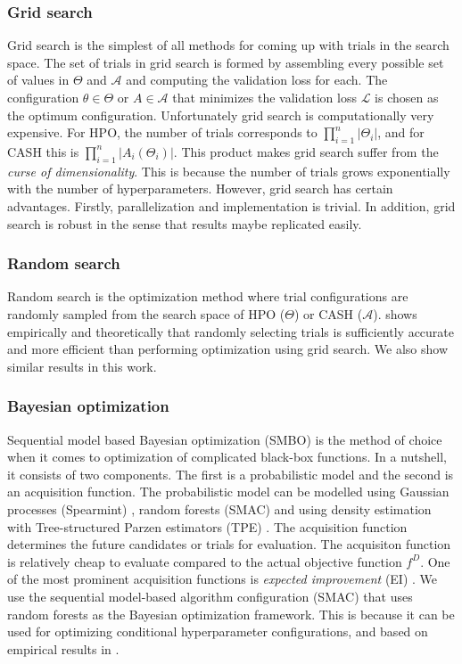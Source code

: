 \subsubsection{Grid search}
\label{grid}
Grid search is the simplest of all methods for coming up with trials in the search space. The set of trials in grid search is formed by assembling every possible set of values in $\Theta$ and $\mathcal{A}$ and computing the validation loss for each. The configuration $\theta \in \Theta$ or $A \in \mathcal{A}$ that minimizes the validation loss $\mathcal{L}$ is chosen as the optimum configuration. Unfortunately grid search is computationally very expensive. For HPO, the number of trials corresponds to $\prod_{i=1}^n |\Theta_i|$, and for CASH this is $\prod_{i=1}^n |A_i(\Theta_i)|$. This product makes grid search suffer from the \textit{curse of dimensionality}. This is because the number of trials grows exponentially with the number of hyperparameters. However, grid search has certain advantages. Firstly, parallelization and implementation is trivial. In addition, grid search is robust in the sense that results maybe replicated easily. 

\subsubsection{Random search}
\label{random}
Random search is the optimization method where trial configurations are randomly sampled from the search space of HPO ($\Theta$) or CASH ($\mathcal{A}$). \cite{bergstra2012random} shows empirically and theoretically that randomly selecting trials is sufficiently accurate and more efficient than performing optimization using grid search. We also show similar results in this work.

\subsubsection{Bayesian optimization}
\label{bayesian}
Sequential model based Bayesian optimization (SMBO) \cite{hutter2011sequential} is the method of choice when it comes to optimization of complicated black-box functions. In a nutshell, it consists of two components. The first is a probabilistic model and the second is an acquisition function. The probabilistic model can be modelled using Gaussian processes (Spearmint) \cite{snoek2012practical}, random forests (SMAC) \cite{hutter2011sequential} and using density estimation with Tree-structured Parzen estimators (TPE) \cite{bergstra2011algorithms}. The acquisition function determines the future candidates or trials for evaluation. The acquisiton function is relatively cheap to evaluate compared to the actual objective function $f^D$. One of the most prominent acquisition functions is \textit{expected improvement} (EI) \cite{expected_improvement}. We use the sequential model-based algorithm configuration (SMAC) that uses random forests as the Bayesian optimization framework. This is because it can be used for optimizing conditional hyperparameter configurations, and based on empirical results in \cite{eggensperger2013towards}.

